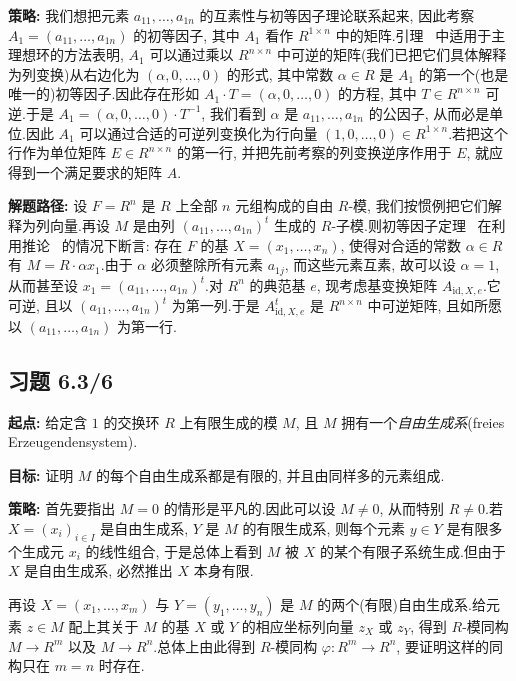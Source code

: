 \noindent\textbf{策略:} 我们想把元素 $a_{11}, \ldots, a_{1n}$ 的互素性与初等因子理论联系起来, 因此考察 $A_1 = (a_{11}, \ldots, a_{1n})$ 的初等因子, 其中 $A_1$ 看作 $R^{1 \times n}$ 中的矩阵.引理~ 中适用于主理想环的方法表明, $A_1$ 可以通过乘以 $R^{n \times n}$ 中可逆的矩阵(我们已把它们具体解释为列变换)从右边化为 $( \alpha, 0, \ldots, 0 )$ 的形式, 其中常数 $\alpha \in R$ 是 $A_1$ 的第一个(也是唯一的)初等因子.因此存在形如 $A_1 \cdot T = ( \alpha, 0, \ldots, 0 )$ 的方程, 其中 $T \in R^{n \times n}$ 可逆.于是 $A_1 = ( \alpha, 0, \ldots, 0 ) \cdot T^{-1}$, 我们看到 $\alpha$ 是 $a_{11}, \ldots, a_{1n}$ 的公因子, 从而必是单位.因此 $A_1$ 可以通过合适的可逆列变换化为行向量 $(1, 0, \ldots, 0) \in R^{1 \times n}$.若把这个行作为单位矩阵 $E \in R^{n \times n}$ 的第一行, 并把先前考察的列变换逆序作用于 $E$, 就应得到一个满足要求的矩阵 $A$.

\noindent\textbf{解题路径:} 设 $F = R^n$ 是 $R$ 上全部 $n$ 元组构成的自由 $R$-模, 我们按惯例把它们解释为列向量.再设 $M$ 是由列 $(a_{11}, \ldots, a_{1n})^t$ 生成的 $R$-子模.则初等因子定理~ 在利用推论~ 的情况下断言: 存在 $F$ 的基 $X = (x_1, \ldots, x_n)$, 使得对合适的常数 $\alpha \in R$ 有 $M = R \cdot \alpha x_1$.由于 $\alpha$ 必须整除所有元素 $a_{1j}$, 而这些元素互素, 故可以设 $\alpha = 1$, 从而甚至设 $x_1 = (a_{11}, \ldots, a_{1n})^t$.对 $R^n$ 的典范基 $e$, 现考虑基变换矩阵 $A_{\mathrm{id}, X, e}$.它可逆, 且以 $(a_{11}, \ldots, a_{1n})^t$ 为第一列.于是 $A_{\mathrm{id}, X, e}^t$ 是 $R^{n \times n}$ 中可逆矩阵, 且如所愿以 $(a_{11}, \ldots, a_{1n})$ 为第一行.

\subsection*{习题 6.3/6}

\noindent\textbf{起点:} 给定含 $1$ 的交换环 $R$ 上有限生成的模 $M$, 且 $M$ 拥有一个\emph{自由生成系}(\textup{freies Erzeugendensystem}).

\noindent\textbf{目标:} 证明 $M$ 的每个自由生成系都是有限的, 并且由同样多的元素组成.

\noindent\textbf{策略:} 首先要指出 $M = 0$ 的情形是平凡的.因此可以设 $M \neq 0$, 从而特别 $R \neq 0$.若 $X = (x_i)_{i \in I}$ 是自由生成系, $Y$ 是 $M$ 的有限生成系, 则每个元素 $y \in Y$ 是有限多个生成元 $x_i$ 的线性组合, 于是总体上看到 $M$ 被 $X$ 的某个有限子系统生成.但由于 $X$ 是自由生成系, 必然推出 $X$ 本身有限.

再设 $X = (x_1, \ldots, x_m)$ 与 $Y = (y_1, \ldots, y_n)$ 是 $M$ 的两个(有限)自由生成系.给元素 $z \in M$ 配上其关于 $M$ 的基 $X$ 或 $Y$ 的相应坐标列向量 $z_X$ 或 $z_Y$, 得到 $R$-模同构 $M \longrightarrow R^m$ 以及 $M \longrightarrow R^n$.总体上由此得到 $R$-模同构 $\varphi \colon R^m \longrightarrow R^n$, 要证明这样的同构只在 $m = n$ 时存在.

